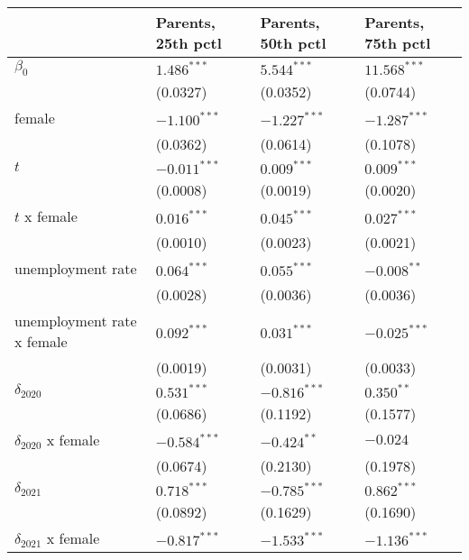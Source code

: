 \begin{tabular}{llll}
\toprule
{} & Parents, 25th pctl & Parents, 50th pctl & Parents, 75th pctl \\
\midrule
$\beta_0$                  &      $1.486^{***}$ &      $5.544^{***}$ &     $11.568^{***}$ \\
                           &           (0.0327) &           (0.0352) &           (0.0744) \\
female                     &     $-1.100^{***}$ &     $-1.227^{***}$ &     $-1.287^{***}$ \\
                           &           (0.0362) &           (0.0614) &           (0.1078) \\
$t$                        &     $-0.011^{***}$ &      $0.009^{***}$ &      $0.009^{***}$ \\
                           &           (0.0008) &           (0.0019) &           (0.0020) \\
$t$ x female               &      $0.016^{***}$ &      $0.045^{***}$ &      $0.027^{***}$ \\
                           &           (0.0010) &           (0.0023) &           (0.0021) \\
unemployment rate          &      $0.064^{***}$ &      $0.055^{***}$ &      $-0.008^{**}$ \\
                           &           (0.0028) &           (0.0036) &           (0.0036) \\
unemployment rate x female &      $0.092^{***}$ &      $0.031^{***}$ &     $-0.025^{***}$ \\
                           &           (0.0019) &           (0.0031) &           (0.0033) \\
$\delta_{2020}$            &      $0.531^{***}$ &     $-0.816^{***}$ &       $0.350^{**}$ \\
                           &           (0.0686) &           (0.1192) &           (0.1577) \\
$\delta_{2020}$ x female   &     $-0.584^{***}$ &      $-0.424^{**}$ &           $-0.024$ \\
                           &           (0.0674) &           (0.2130) &           (0.1978) \\
$\delta_{2021}$            &      $0.718^{***}$ &     $-0.785^{***}$ &      $0.862^{***}$ \\
                           &           (0.0892) &           (0.1629) &           (0.1690) \\
$\delta_{2021}$ x female   &     $-0.817^{***}$ &     $-1.533^{***}$ &     $-1.136^{***}$ \\

\end{tabular}
